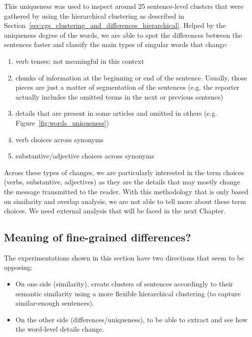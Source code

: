 This uniqueness was used to inspect around 25 sentence-level clusters that were gathered by using the hierarchical clustering as described in Section~\ref{sec:cgs_clustering_and_differences_hierarchical}. Helped by the uniqueness degree of the words, we are able to spot the differences between the sentences faster and classify the main types of singular words that change:
\begin{enumerate}
    \item verb tenses: not meaningful in this context
    \item chunks of information at the beginning or end of the sentence. Usually, those pieces are just a matter of segmentation of the sentences (e.g. the reporter actually includes the omitted terms in the next or previous sentence) 
    \item details that are present in some articles and omitted in others (e.g. Figure~\ref{fig:words_uniqueness})
    \item verb choices across synonyms
    \item substantive/adjective choices across synonyms
\end{enumerate}

Across these types of changes, we are particularly interested in the term choices (verbs, substantive, adjectives) as they are the details that may mostly change the message transmitted to the reader.
With this methodology that is only based on similarity and overlap analysis, we are not able to tell more about these term choices. We need external analysis that will be faced in the next Chapter.

\subsection{\statusgreen Meaning of fine-grained differences?}
The experimentations shown in this section have two directions that seem to be opposing: 
\begin{itemize}
    \item On one side (similarity), create clusters of sentences accordingly to their semantic similarity using a more flexible hierarchical clustering (to capture similar-enough sentences). %
    \item On the other side (differences/uniqueness), to be able to extract and see how the word-level details change.
\end{itemize}

